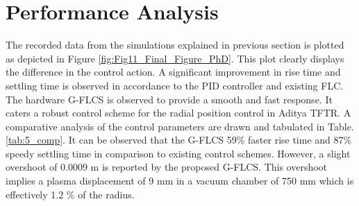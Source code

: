 \section{Performance Analysis}
The recorded data from the simulations explained in previous section is plotted as depicted in Figure \ref{fig:Fig11_Final_Figure_PhD}. This plot clearly displays the difference in the control action. A significant improvement in rise time and settling time is observed in accordance to the PID controller and existing FLC. The hardware G-FLCS is observed to provide a smooth and fast response. It caters a robust control scheme for the radial position control in Aditya TFTR. A comparative analysis of the control parameters are drawn and tabulated in Table. \ref{tab:5_comp}. It can be observed that the G-FLCS 59\% faster rise time and 87\% speedy settling time in comparison to existing control schemes. However, a slight overshoot of 0.0009 m is reported by the proposed G-FLCS. This overshoot implies a plasma displacement of 9 mm in a vacuum chamber of 750 mm which is effectively 1.2 \% of the radius.

